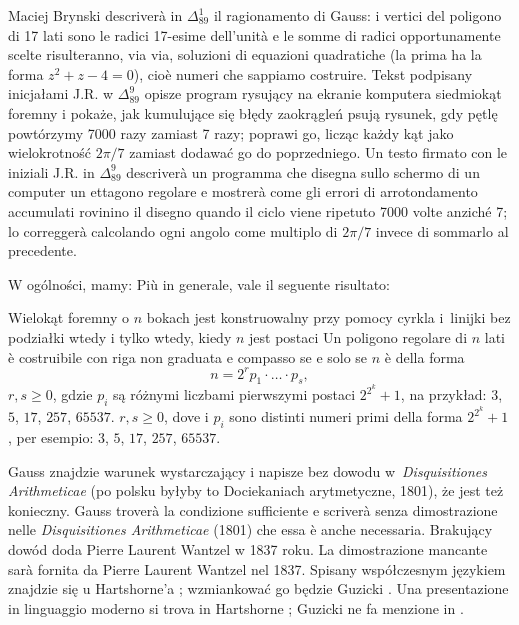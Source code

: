 Maciej Brynski descriverà in $\Delta_{89}^{1}$ il ragionamento di Gauss: i vertici del poligono di 17 lati sono le radici 17-esime dell'unità e le somme di radici opportunamente scelte risulteranno, via via, soluzioni di equazioni quadratiche (la prima ha la forma $z^2 + z - 4 = 0$), cioè numeri che sappiamo costruire. %
Tekst podpisany inicjałami J.R. w $\Delta_{89}^{9}$ opisze program rysujący na ekranie komputera siedmiokąt foremny i pokaże, jak kumulujące się błędy zaokrągleń psują rysunek, gdy pętlę powtórzymy 7000 razy zamiast 7 razy; poprawi go, licząc każdy kąt jako wielokrotność $2\pi/7$ zamiast dodawać go do poprzedniego. %
Un testo firmato con le iniziali J.R. in $\Delta_{89}^{9}$ descriverà un programma che disegna sullo schermo di un computer un ettagono regolare e mostrerà come gli errori di arrotondamento accumulati rovinino il disegno quando il ciclo viene ripetuto 7000 volte anziché 7; lo correggerà calcolando ogni angolo come multiplo di $2\pi/7$ invece di sommarlo al precedente. %

W ogólności, mamy: %
Più in generale, vale il seguente risultato: %
\begin{theorem}
[Gaussa-Wantzla] %
[di Gauss-Wantzel] %
    \label{gauss_wantzel}%
    Wielokąt foremny o $n$ bokach jest konstruowalny przy pomocy cyrkla i~linijki bez podziałki wtedy i tylko wtedy, kiedy $n$ jest postaci %
    Un poligono regolare di $n$ lati è costruibile con riga non graduata e compasso se e solo se $n$ è della forma %
    \begin{equation}
        n = 2^r p_1 \cdot \ldots \cdot p_s,
    \end{equation}
    $r, s \ge 0$, gdzie $p_i$ są różnymi liczbami pierwszymi postaci $2^{2^k} + 1$, na przykład: $3$, $5$, $17$, $257$, $65537$. %
    $r, s \ge 0$, dove i $p_i$ sono distinti numeri primi della forma $2^{2^k}+1$, per esempio: $3$, $5$, $17$, $257$, $65537$. %
\end{theorem}

Gauss znajdzie warunek wystarczający i napisze bez dowodu w~\emph{Disquisitiones Arithmeticae} (po polsku byłyby to Dociekaniach arytmetyczne, 1801), że jest też konieczny. %
Gauss troverà la condizione sufficiente e scriverà senza dimostrazione nelle \emph{Disquisitiones Arithmeticae} (1801) che essa è anche necessaria. %
Brakujący dowód doda Pierre Laurent Wantzel w 1837 roku. %
La dimostrazione mancante sarà fornita da Pierre Laurent Wantzel nel 1837. %
%
Spisany współczesnym językiem znajdzie się u Hartshorne'a \cite[s. 258]{hartshorne_2000}; wzmiankować go będzie Guzicki \cite[s. 285]{guzicki_2021}. %
Una presentazione in linguaggio moderno si trova in Hartshorne \cite[p. 258]{hartshorne_2000}; Guzicki ne fa menzione in \cite[p. 285]{guzicki_2021}. %


